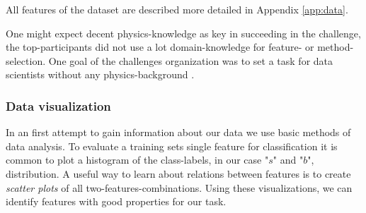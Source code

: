 All features of the dataset are described more detailed in Appendix \ref{app:data}.

One might expect decent physics-knowledge as key in succeeding in the challenge, the top-participants did not use a lot domain-knowledge for feature- or method-selection. One goal of the challenges organization was to set a task for data scientists without any physics-background \cite{higgsPaper}.

\subsubsection{Data visualization}

In an first attempt to gain information about our data we use basic methods of data analysis.
To evaluate a training sets single feature for classification it is common to plot a histogram of the class-labels, in our case "$s$" and "$b$", distribution. A useful way to learn about relations between features is to create \textit{scatter plots} of all two-features-combinations.
Using these visualizations, we can identify features with good properties for our task.



